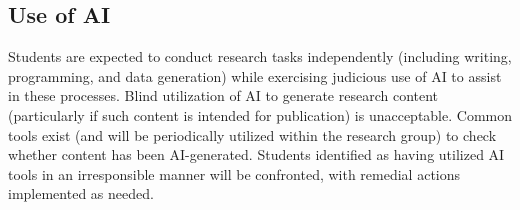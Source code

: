 \documentclass[12pt,a4paper,article,oneside]{memoir} %
\begin{document}
\subsection{Use of AI}

Students are expected to conduct research tasks independently (including writing, programming, and data generation) while exercising judicious use of AI to assist in these processes. Blind utilization of AI to generate research content (particularly if such content is intended for publication) is unacceptable. Common tools exist (and will be periodically utilized within the research group) to check whether content has been AI-generated. Students identified as having utilized AI tools in an irresponsible manner will be confronted, with remedial actions implemented as needed.
\end{document}
